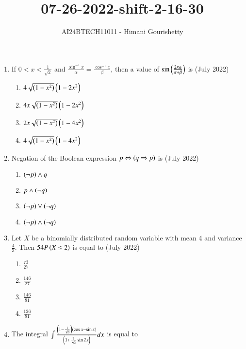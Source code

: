 \documentclass[journal,12pt,onecolumn]{IEEEtran}
\theoremstyle{remark}
\begin{document}

\vspace{3cm}

\title{07-26-2022-shift-2-16-30}
\author{AI24BTECH11011 - Himani Gourishetty}
\maketitle
\bigskip

\renewcommand{\thefigure}{\theenumi}
\renewcommand{\thetable}{\theenumi}
\begin{enumerate}
    \item If $0<x<\frac{1}{\sqrt{2}}$ and $\frac{\sin^{-1}x}{\alpha}=\frac{\cos^{-1}x}{\beta}$, then a value of $\sin\left(\frac{2\pi\alpha}{\alpha+\beta}\right)$ is 
	    \hfill{(July 2022)}
	\begin{enumerate}
        \item $4\sqrt{\left(1-x^2\right)}\left(1-2x^2\right)$
        \item $4x\sqrt{\left(1-x^2\right)}\left(1-2x^2\right)$
        \item $2x\sqrt{\left(1-x^2\right)}\left(1-4x^2\right)$
        \item $4\sqrt{\left(1-x^2\right)}\left(1-4x^2\right)$
    \end{enumerate}
    \item Negation of the Boolean expression $p \Leftrightarrow \left(q \Rightarrow p\right)$ is
    \hfill{(July 2022)} 
	\begin{enumerate}
        \item $\left(\neg p\right) \land q$
        \item $p \land \left(\neg q\right)$
        \item $\left(\neg p\right) \lor \left(\neg q\right)$
        \item $\left(\neg p\right)\land \left(\neg q\right)$
    \end{enumerate}
    \item Let $X$ be a binomially distributed random variable with mean 4 and variance $\frac{4}{3}$. Then $54 P \left(X \leq 2\right)$ is equal to
    \hfill{(July 2022)} 
	\begin{enumerate}
        \item $\frac{73}{27}$
        \item $\frac{146}{27}$
        \item $\frac{146}{81}$
        \item $\frac{126}{81}$
    \end{enumerate}
    \item The integral $\int\frac{\left(1-\frac{1}{\sqrt{3}}\right)\left(\cos x - \sin x\right)}{\left(1+\frac{2}{\sqrt{3}}\sin 2x\right)} dx$ is equal to 

\end{enumerate}
\end{document}
